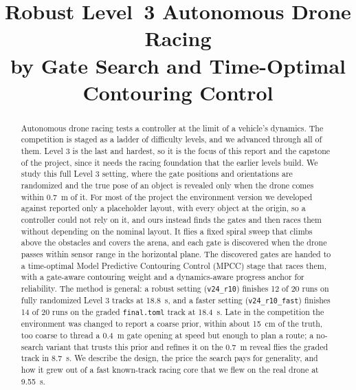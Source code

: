 \documentclass[conference]{IEEEtran}
\begin{document}
\title{Robust Level~3 Autonomous Drone Racing\\ by Gate Search and Time-Optimal Contouring Control}

\author{
\and
{}
}

\maketitle

\begin{abstract}
Autonomous drone racing tests a controller at the limit of a vehicle's dynamics. The competition is staged as a ladder of difficulty levels, and we advanced through all of them. Level 3 is the last and hardest, so it is the focus of this report and the capstone of the project, since it needs the racing foundation that the earlier levels build. We study this full Level 3 setting, where the gate positions and orientations are randomized and the true pose of an object is revealed only when the drone comes within 0.7~m of it. For most of the project the environment version we developed against reported only a placeholder layout, with every object at the origin, so a controller could not rely on it, and ours instead finds the gates and then races them without depending on the nominal layout. It flies a fixed spiral sweep that climbs above the obstacles and covers the arena, and each gate is discovered when the drone passes within sensor range in the horizontal plane. The discovered gates are handed to a time-optimal Model Predictive Contouring Control (MPCC) stage that races them, with a gate-aware contouring weight and a dynamics-aware progress anchor for reliability. The method is general: a robust setting (\texttt{v24\_r10}) finishes 12 of 20 runs on fully randomized Level 3 tracks at 18.8~s, and a faster setting (\texttt{v24\_r10\_fast}) finishes 14 of 20 runs on the graded \texttt{final.toml} track at 18.4~s. Late in the competition the environment was changed to report a coarse prior, within about 15~cm of the truth, too coarse to thread a 0.4~m gate opening at speed but enough to plan a route; a no-search variant that trusts this prior and refines it on the 0.7~m reveal flies the graded track in 8.7~s. We describe the design, the price the search pays for generality, and how it grew out of a fast known-track racing core that we flew on the real drone at 9.55~s.
\end{abstract}
\end{document}
